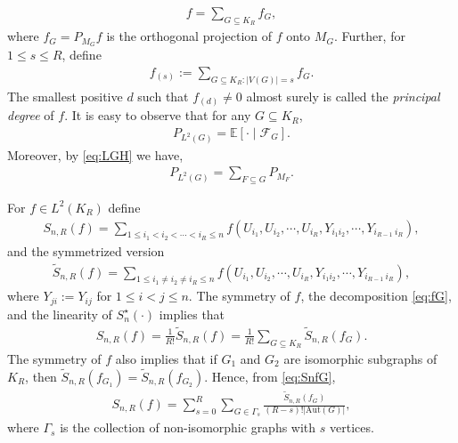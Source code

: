 \documentclass[11pt,reqno]{amsart}
\numberwithin{equation}{section}
\theoremstyle{definition}
\begin{document}
\begin{align}\label{eq:fG}
    f = \sum_{G \subseteq K_{R} } f_{G} , 
\end{align}
where $f_{G}=P_{M_G}f$ is the orthogonal projection of $f$ onto $M_{G}$. 
Further, for $1 \leq s \leq R$, define 
\begin{align}\label{eq:fs}
    f_{(s)}:=\sum_{G \subseteq K_{R}: |V(G)|=s} f_{G} .
\end{align}
The smallest positive $d$ such that $f_{(d)}\neq 0$ almost surely is called the {\it principal degree} of $f$.
It is easy to observe that for any $G\subseteq K_{R}$,
\begin{align}\label{eq:L2G-projection} 
    P_{L^{2}(G)} = \mathbb{E}\left[\cdot\middle| \mathcal{F}_{G}\right].
\end{align}
Moreover, by \eqref{eq:LGH} we have,
\begin{align}\label{eq:PL2-decomp}
    P_{L^{2}(G)} = \sum_{F \subseteq G}P_{M_{F}} . 
\end{align} 

For $f \in L^{2}(K_R)$ define  
\begin{align}\label{eq:def-Sn}
    S_{n,R}(f) = \sum_{1\leq i_{1}<i_{2}<\cdots<i_{R}\leq n}f(U_{i_{1}},U_{i_{2}},\cdots, U_{i_{R}}, Y_{i_{1} i_{2}},\cdots, Y_{i_{R-1}~i_{R}}) , 
\end{align}
and the symmetrized version  
\begin{align}\label{eq:def-Sn-star}
    \tilde{S}_{n,R}(f) = \sum_{ 1\leq i_{1} \ne i_2 \ne i_{R} \leq n }f(U_{i_{1}},U_{i_{2}},\cdots, U_{i_{R}}, Y_{i_{1}i_{2}},\cdots, Y_{i_{R-1}~i_{R}}) , 
\end{align}
where $Y_{ji}:= Y_{ij}$ for $1 \leq i < j \leq n$.
The symmetry of $f$, the decomposition \eqref{eq:fG}, and the linearity of $S_n^\star(\cdot)$ implies that  
\begin{align}\label{eq:SnfG}
S_{n,R}(f) = \frac{1}{R!} \tilde{S}_{n,R}(f) = \frac{1}{R!} \sum_{G \subseteq K_R} \tilde{S}_{n,R}(f_{G}) .  
\end{align}
The symmetry of $f$ also implies that if $G_1$ and $G_2$ are isomorphic subgraphs of $K_R$, then $\tilde{S}_{n,R}(f_{G_1}) = \tilde{S}_{n,R}(f_{G_2})$. Hence, from \eqref{eq:SnfG},  
\begin{align}
S_{n,R}(f) = \sum_{s=0}^R \sum_{G\in\Gamma_{s}}\frac{\tilde{S}_{n,R}(f_{G})}{(R-s)!|\mathrm{Aut}(G)|} , 
\label{eq:SnfGR}
\end{align}
where $\Gamma_s$ is the collection of non-isomorphic graphs with $s$ vertices.
\end{document}
